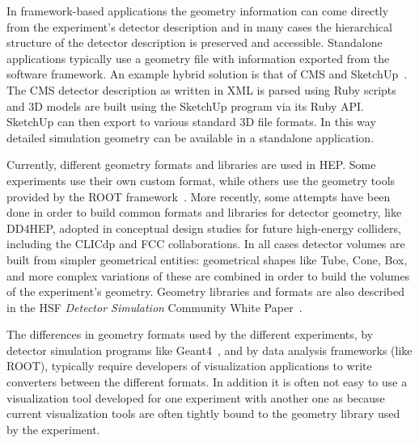\documentclass[12pt,a4paper]{article}
\begin{document}



In framework-based applications the geometry information can come directly from the experiment's detector description and in
 many cases the hierarchical structure of the detector description is preserved and accessible. Standalone applications
typically use a geometry file with information exported from the software framework. An example hybrid solution is that of CMS and SketchUp~\cite{CMSSketchUp}.
The CMS detector description as written in XML is parsed using Ruby scripts and 3D models are built using the SketchUp program via its
Ruby API. SketchUp can then export to various standard 3D file formats. In this way detailed simulation geometry can be available in a standalone
application.


Currently, different geometry formats and libraries are used in HEP.
Some experiments use their own custom format, while others use the geometry tools provided by the ROOT framework~\cite{Root1997}. More recently, some attempts have been
done in order to build common formats and libraries for detector geometry, like DD4HEP,  adopted in conceptual design studies
for future high-energy colliders, including the CLICdp and FCC collaborations. In all cases detector
volumes are built from simpler geometrical entities: geometrical shapes like Tube, Cone, Box, and more complex variations of these
are combined in order to build the volumes of the experiment’s geometry. Geometry libraries and formats are also described in the HSF \textit{Detector Simulation} Community White Paper~\cite{HSF-CWP-2017-07}.

The differences in geometry formats used by the different experiments, by detector simulation programs like Geant4~\cite{Geant4},
and by data analysis frameworks (like ROOT), typically require developers of visualization applications to write converters
between the different formats. In addition it is often not easy to use a visualization tool developed for one experiment with another one as
because current visualization tools are often tightly bound to the geometry library used by the experiment.

\end{document}
